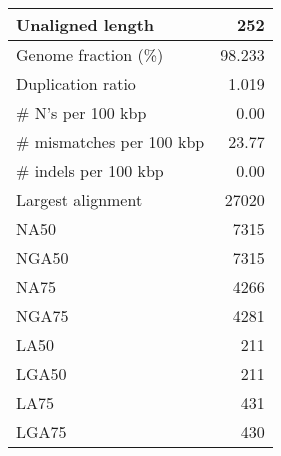 \documentclass[12pt,a4paper]{article}
\begin{document}
\begin{table}[ht]
\begin{center}
\begin{tabular}{|l*{1}{|r}|}
Unaligned length & 252 \\ \hline
Genome fraction (\%) & 98.233 \\ \hline
Duplication ratio & 1.019 \\ \hline
\# N's per 100 kbp & 0.00 \\ \hline
\# mismatches per 100 kbp & 23.77 \\ \hline
\# indels per 100 kbp & 0.00 \\ \hline
Largest alignment & 27020 \\ \hline
NA50 & 7315 \\ \hline
NGA50 & 7315 \\ \hline
NA75 & 4266 \\ \hline
NGA75 & 4281 \\ \hline
LA50 & 211 \\ \hline
LGA50 & 211 \\ \hline
LA75 & 431 \\ \hline
LGA75 & 430 \\ \hline
\end{tabular}
\end{center}
\end{table}
\end{document}
